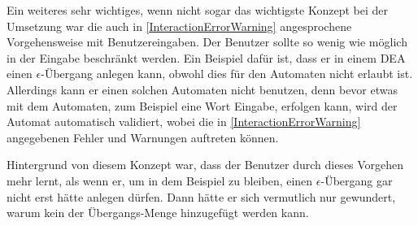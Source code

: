 Ein weiteres sehr wichtiges, wenn nicht sogar das wichtigste Konzept bei der
Umsetzung war die auch in \ref{InteractionErrorWarning} angesprochene
Vorgehensweise mit Benutzereingaben. Der Benutzer sollte so wenig wie möglich
in der Eingabe beschränkt werden. Ein Beispiel dafür ist, dass er in einem DEA
einen $\epsilon$-Übergang anlegen kann, obwohl dies für den Automaten nicht
erlaubt ist. Allerdings kann er einen solchen Automaten nicht benutzen, denn
bevor etwas mit dem Automaten, zum Beispiel eine Wort Eingabe, erfolgen kann,
wird der Automat automatisch validiert, wobei die in
\ref{InteractionErrorWarning} angegebenen Fehler und Warnungen auftreten
können.\vspace{10pt}

Hintergrund von diesem Konzept war, dass der Benutzer durch dieses Vorgehen mehr
lernt, als wenn er, um in dem Beispiel zu bleiben, einen $\epsilon$-Übergang gar
nicht erst hätte anlegen dürfen. Dann hätte er sich vermutlich nur gewundert,
warum kein \Symbol{$\epsilon$} der Übergangs-Menge hinzugefügt werden
kann.\vspace{10pt}
